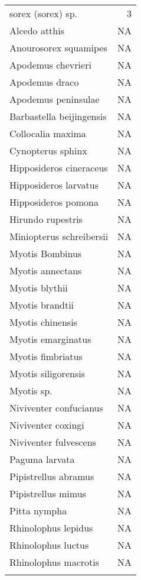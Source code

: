 \documentclass[11pt,article,oneside]{article}
\begin{document}
\begin{longtable}[c]{@{}lr@{}}
sorex (sorex) sp. & 3
\\\addlinespace
Alcedo atthis & NA
\\\addlinespace
Anourosorex squamipes & NA
\\\addlinespace
Apodemus chevrieri & NA
\\\addlinespace
Apodemus draco & NA
\\\addlinespace
Apodemus peninsulae & NA
\\\addlinespace
Barbastella beijingensis & NA
\\\addlinespace
Collocalia maxima & NA
\\\addlinespace
Cynopterus sphinx & NA
\\\addlinespace
Hipposideros cineraceus & NA
\\\addlinespace
Hipposideros larvatus & NA
\\\addlinespace
Hipposideros pomona & NA
\\\addlinespace
Hirundo rupestris & NA
\\\addlinespace
Miniopterus schreibersii & NA
\\\addlinespace
Myotis Bombinus & NA
\\\addlinespace
Myotis annectans & NA
\\\addlinespace
Myotis blythii & NA
\\\addlinespace
Myotis brandtii & NA
\\\addlinespace
Myotis chinensis & NA
\\\addlinespace
Myotis emarginatus & NA
\\\addlinespace
Myotis fimbriatus & NA
\\\addlinespace
Myotis siligorensis & NA
\\\addlinespace
Myotis sp. & NA
\\\addlinespace
Niviventer confucianus & NA
\\\addlinespace
Niviventer coxingi & NA
\\\addlinespace
Niviventer fulvescens & NA
\\\addlinespace
Paguma larvata & NA
\\\addlinespace
Pipistrellus abramus & NA
\\\addlinespace
Pipistrellus mimus & NA
\\\addlinespace
Pitta nympha & NA
\\\addlinespace
Rhinolophus lepidus & NA
\\\addlinespace
Rhinolophus luctus & NA
\\\addlinespace
Rhinolophus macrotis & NA
\\\addlinespace

\end{longtable}
\end{document}
